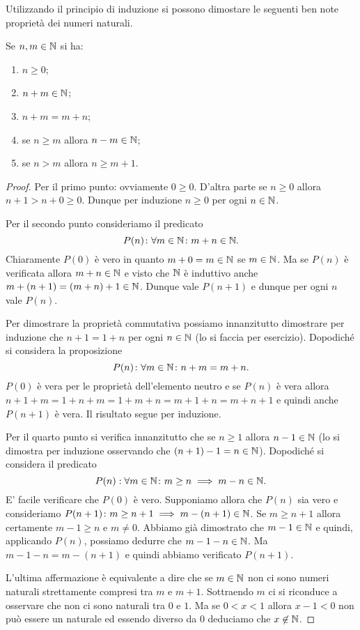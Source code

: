 Utilizzando il principio di induzione si possono dimostare le seguenti 
ben note proprietà dei numeri naturali.
\begin{theorem}
  Se $n,m\in \mathbb N$ si ha:
  \begin{enumerate}
    \item $n\ge 0$;
    \item $n+m\in \mathbb N$;
    \item $n+m = m+n$;
    \item se $n\ge m$ allora $n-m\in \mathbb N$;
    \item se $n>m$ allora $n\ge m+1$.
  \end{enumerate}
\end{theorem}
\begin{proof}
Per il primo punto: ovviamente $0\ge 0$. D'altra parte 
se $n\ge 0$ allora $n+1>n+0 \ge 0$. 
Dunque per induzione $n\ge 0$ per ogni $n\in \mathbb N$.

Per il secondo punto consideriamo il predicato 
\[
P(n)\colon \forall m\in \mathbb N\colon m+n\in \mathbb N.  
\]
Chiaramente $P(0)$ è vero in quanto $m+0 = m\in \mathbb N$ se $m\in \mathbb N$.
Ma se $P(n)$ è verificata allora $m+n\in \mathbb N$ e visto che $\mathbb N$ 
è induttivo anche $m+(n+1) = (m+n)+1\in \mathbb N$. 
Dunque vale $P(n+1)$ e dunque per ogni $n$ vale $P(n)$.

Per dimostrare la proprietà commutativa possiamo innanzitutto dimostrare 
per induzione che $n+1=1+n$ per ogni $n\in \mathbb N$ (lo si faccia per esercizio).
Dopodiché si considera la proposizione 
\[
 P(n)\colon \forall m\in \mathbb N\colon n+m = m+n.  
\]
$P(0)$ è vera per le proprietà dell'elemento neutro 
e se $P(n)$ è vera allora 
$n+1+m = 1+n+m = 1 + m + n = m + 1 + n = m + n +1$
e quindi anche $P(n+1)$ è vera. Il risultato segue per induzione.

Per il quarto punto si verifica innanzitutto che se $n\ge 1$ allora 
$n-1\in \mathbb N$ 
(lo si dimostra per induzione osservando che $(n+1)-1=n\in\mathbb N$).
Dopodiché si considera il predicato
\[
P(n): \forall m\in \mathbb N \colon m\ge n \implies m-n\in \mathbb N.  
\]
E' facile verificare che $P(0)$ è vero.
Supponiamo allora che $P(n)$ sia vero e consideriamo 
$P(n+1)\colon m\ge n+1 \implies m-(n+1)\in \mathbb N$.
Se $m\ge n+1$ allora certamente $m-1\ge n$ e $m\neq 0$.
Abbiamo già dimostrato che $m-1\in\mathbb N$
e quindi, applicando $P(n)$, possiamo dedurre che $m-1-n\in \mathbb N$.
Ma $m-1-n = m-(n+1)$ e quindi abbiamo verificato $P(n+1)$.

L'ultima affermazione è equivalente a dire che se $m\in \mathbb N$ 
non ci sono numeri naturali strettamente compresi tra $m$ e $m+1$.
Sottraendo $m$ ci si riconduce a osservare che non ci sono naturali 
tra $0$ e $1$.
Ma se $0<x<1$ allora $x-1<0$ non può essere un naturale ed essendo 
diverso da $0$ deduciamo che $x\not \in \mathbb N$.
\end{proof}

